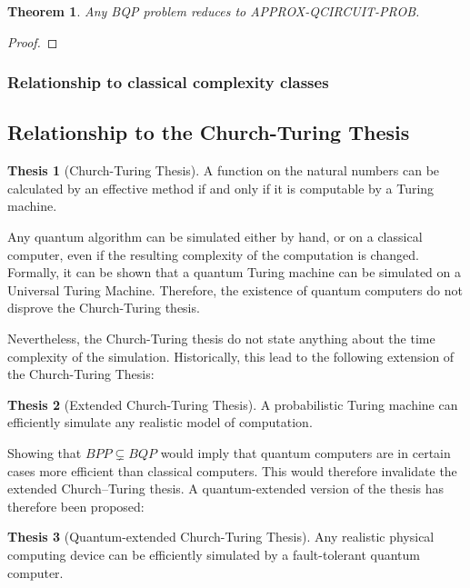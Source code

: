 \documentclass[12pt,a4paper]{article}
\theoremstyle{plain}
\newtheorem*{theorem}{Theorem}
\theoremstyle{definition}
\newtheorem*{thesis}{Thesis}
\begin{document}
\begin{theorem}
    Any BQP problem reduces to APPROX-QCIRCUIT-PROB.
\end{theorem}

\begin{proof}
    
\end{proof}

\subsubsection{Relationship to classical complexity classes}


\subsection{Relationship to the Church-Turing Thesis}
\begin{thesis}[Church-Turing Thesis]
    A function on the natural numbers can be calculated by an effective method if and only if it is computable by a Turing machine.
\end{thesis}

Any quantum algorithm can be simulated either by hand, or on a classical computer, even if the resulting complexity of the computation is changed. Formally, it can be shown that a quantum Turing machine can be simulated on a Universal Turing Machine. Therefore, the existence of quantum computers do not disprove the Church-Turing thesis.

Nevertheless, the Church-Turing thesis do not state anything about the time complexity of the simulation. Historically, this lead to the following extension of the Church-Turing Thesis:
\begin{thesis}[Extended Church-Turing Thesis]
    A probabilistic Turing machine can efficiently simulate any realistic model of computation.
\end{thesis}

Showing that $BPP \varsubsetneq BQP$ would imply that quantum computers are in certain cases more efficient than classical computers. This would therefore invalidate the extended Church–Turing thesis. A quantum-extended version of the thesis has therefore been proposed\cite{quantum-applied}:
\begin{thesis}[Quantum-extended Church-Turing Thesis]
    Any realistic physical computing device can be efficiently simulated by a fault-tolerant quantum computer.
\end{thesis}
\end{document}
